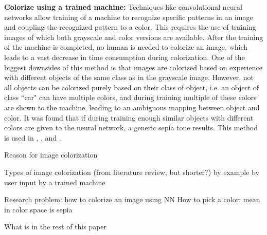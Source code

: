 \textbf{Colorize using a trained machine:} Techniques like convolutional neural networks allow training of a machine to recognize specific patterns in an image and coupling the recognized pattern to a color. This requires the use of training images of which both grayscale and color versions are available. After the training of the machine is completed, no human is needed to colorize an image, which leads to a vast decrease in time consumption during colorization. One of the biggest downsides of this method is that images are colorized based on experience with different objects of the same class as in the grayscale image. However, not all objects can be colorized purely based on their class of object, i.e. an object of class ``car" can have multiple colors, and during training multiple of these colors are shown to the machine, leading to an ambiguous mapping between object and color. It was found that if during training enough similar objects with different colors are given to the neural network, a generic sepia tone results. This method is used in \cite{Cheng}, \cite{Ho}, \cite{Krizhevsky} and \cite{Dahl}.






Reason for image colorization
	
	
	
Types of image colorization (from literature review, but shorter?)
	by example
	by user input
	by a trained machine
	
	
	
Research problem: 
	how to colorize an image using NN
	How to pick a color: mean in color space is sepia
	
	
	
What is in the rest of this paper
	
	
	
	




